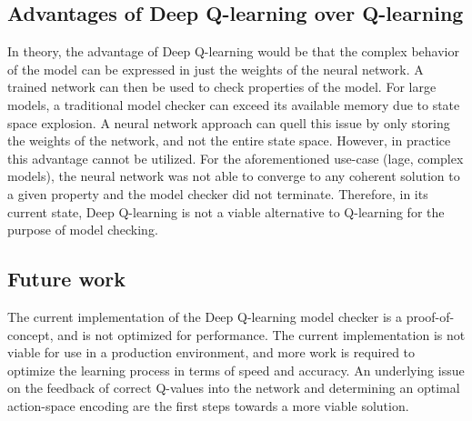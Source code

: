 \subsection{Advantages of Deep Q-learning over Q-learning}

In theory, the advantage of Deep Q-learning would be that the complex behavior of the model can be expressed in just the weights of the neural network. A trained network can then be used to check properties of the model. For large models, a traditional model checker can exceed its available memory due to state space explosion. A neural network approach can quell this issue by only storing the weights of the network, and not the entire state space. However, in practice this advantage cannot be utilized. For the aforementioned use-case (lage, complex models), the neural network was not able to converge to any coherent solution to a given property and the model checker did not terminate. Therefore, in its current state, Deep Q-learning is not a viable alternative to Q-learning for the purpose of model checking.

\subsection{Future work}

The current implementation of the Deep Q-learning model checker is a proof-of-concept, and is not optimized for performance. The current implementation is not viable for use in a production environment, and more work is required to optimize the learning process in terms of speed and accuracy. An underlying issue on the feedback of correct Q-values into the network and determining an optimal action-space encoding are the first steps towards a more viable solution.